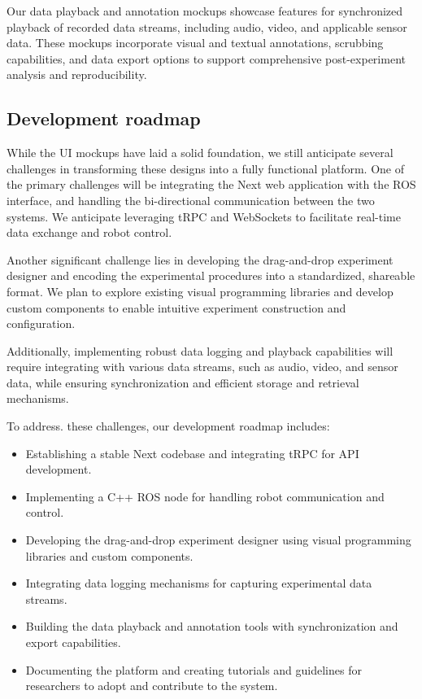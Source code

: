 \documentclass[letterpaper, 10 pt, conference]{ieeeconf}
\begin{document}
Our data playback and annotation mockups showcase features for synchronized playback of recorded data streams, including audio, video, and applicable sensor data. These mockups incorporate visual and textual annotations, scrubbing capabilities, and data export options to support comprehensive post-experiment analysis and reproducibility. 

\subsection{Development roadmap}

While the UI mockups have laid a solid foundation, we still anticipate several challenges in transforming these designs into a fully functional platform. One of the primary challenges will be integrating the Next web application with the ROS interface, and handling the bi-directional communication between the two systems. We anticipate leveraging tRPC and WebSockets to facilitate real-time data exchange and robot control. 

Another significant challenge lies in developing the drag-and-drop experiment designer and encoding the experimental procedures into a standardized, shareable format. We plan to explore existing visual programming libraries and develop custom components to enable intuitive experiment construction and configuration.

Additionally, implementing robust data logging and playback capabilities will require integrating with various data streams, such as audio, video, and sensor data, while ensuring synchronization and efficient storage and retrieval mechanisms. 

To address. these challenges, our development roadmap includes:
\begin{itemize}
	\item Establishing a stable Next codebase and integrating tRPC for API development. 
	\item Implementing a C++ ROS node for handling robot communication and control.
	\item Developing the drag-and-drop experiment designer using visual programming libraries and custom components.
	\item Integrating data logging mechanisms for capturing experimental data streams. 
	\item Building the data playback and annotation tools with synchronization and export capabilities.
	\item Documenting the platform and creating tutorials and guidelines for researchers to adopt and contribute to the system.
\end{itemize}
\end{document}
